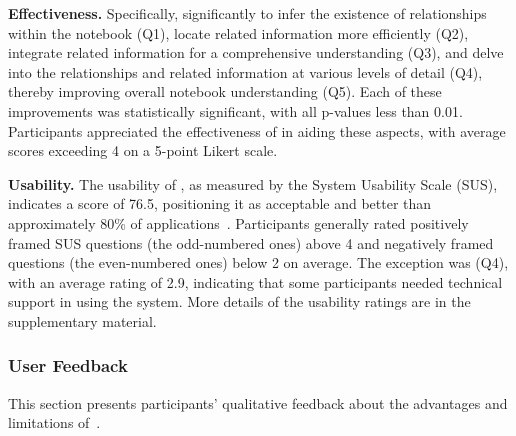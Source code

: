 \textbf{Effectiveness.}
Specifically, \tool significantly  to infer the existence of relationships within the notebook (Q1), locate related information more efficiently (Q2), integrate related information for a comprehensive understanding (Q3), and delve into the relationships and related information at various levels of detail (Q4), thereby improving overall notebook understanding (Q5). 
Each of these improvements was statistically significant, with all p-values less than 0.01.
Participants appreciated the effectiveness of \tool in aiding these aspects, with average scores exceeding 4 on a 5-point Likert scale.


\textbf{Usability.}
The usability of \tool, as measured by the System Usability Scale (SUS), indicates a score of 76.5, positioning it as acceptable and better than approximately 80\% of applications~\cite{sauro2016quantifying, bangor2008empirical}. 
Participants generally rated positively framed SUS questions (the odd-numbered ones) above 4 and negatively framed questions (the even-numbered ones) below 2 on average. 
The exception was (Q4), with an average rating of 2.9, indicating that some participants needed technical support in using the system.
More details of the usability ratings are in the supplementary material.



\subsubsection{User Feedback}
\label{sec:qualitative_analysis}
This section presents participants' qualitative feedback about the advantages and limitations of~\tool.




